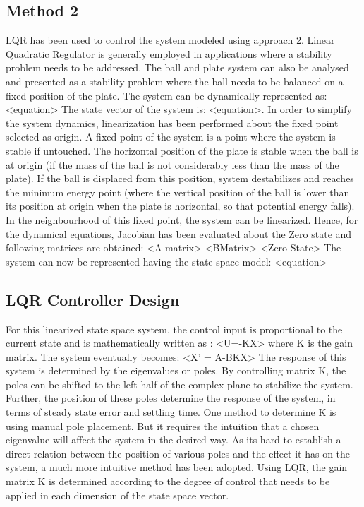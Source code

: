 \documentclass[conference]{IEEEtran}
\begin{document}
\subsection{Method 2}
LQR has been used to control the system modeled using approach 2. Linear Quadratic Regulator is generally employed in applications where a stability problem needs to be addressed. The ball and plate system can also be analysed and presented as a stability problem where the ball needs to be balanced on a fixed position of the plate. The system can be dynamically represented as: <equation> The state vector of the system is: <equation>. In order to simplify the system dynamics, linearization has been performed about the fixed point selected as origin. A fixed point of the system is a point where the system is stable if untouched. The horizontal position of the plate is stable when the ball is at origin (if the mass of the ball is not considerably less than the mass of the plate). If the ball is displaced from this position, system destabilizes and reaches the minimum energy point (where the vertical position of the ball is lower than its position at origin when the plate is horizontal, so that potential energy falls). In the neighbourhood of this fixed point, the system can be linearized. Hence, for the dynamical equations, Jacobian has been evaluated about the Zero state and following matrices are obtained: <A matrix> <BMatrix> <Zero State>
The system can now be represented having the state space model: <equation>

\subsection*{LQR Controller Design}
For this linearized state space system, the control input is proportional to the current state and is mathematically written as : <U=-KX> where K is the gain matrix.
The system eventually becomes: <X’ = A-BKX>
The response of this system is determined by the eigenvalues or poles. By controlling matrix K, the poles can be shifted to the left half of the complex plane to stabilize the system. Further, the position of these poles determine the response of the system, in terms of steady state error and settling time.
One method to determine K is using manual pole placement. But it requires the intuition that a chosen eigenvalue will affect the system in the desired way. As its hard to establish a direct relation between the position of various poles and the effect it has on the system, a much more intuitive method has been adopted. Using LQR, the gain matrix K is determined according to the degree of control that needs to be applied in each dimension of the state space vector.
\end{document}
